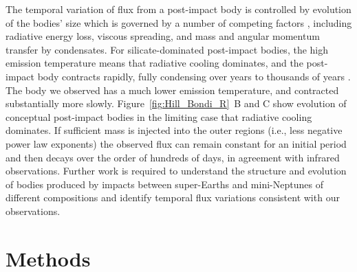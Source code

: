 \documentclass[sn-nature,oneside]{sn-jnl}%
\begin{document}

The temporal variation of flux from a post-impact body is controlled by evolution of the bodies' size which is governed by a number of competing factors \cite{Lock18,Lock2020}, including radiative energy loss, viscous spreading, and mass and angular momentum transfer by condensates.
%
For silicate-dominated post-impact bodies, the high emission temperature means that radiative cooling dominates, and the post-impact body contracts rapidly, fully condensing over years to thousands of years \cite{Lock18,Lock2020}.
%
The body we observed has a much lower emission temperature, and contracted substantially more slowly.
%
Figure~\ref{fig:Hill_Bondi_R}~B and C show evolution of conceptual post-impact bodies in the limiting case that radiative cooling dominates.
%
If sufficient mass is injected into the outer regions (i.e., less negative power law exponents) the observed flux can remain constant for an initial period and then decays over the order of hundreds of days, in agreement with infrared observations.
%
Further work is required to understand the structure and evolution of bodies produced by impacts between super-Earths and mini-Neptunes of different compositions and identify temporal flux variations consistent with our observations.

\clearpage

\setcounter{figure}{0}    

\renewcommand\figurename{Extended Data Fig.}%
\renewcommand\tablename{Extended Data Table}%


\section{Methods}\label{sec:methods}
\end{document}
